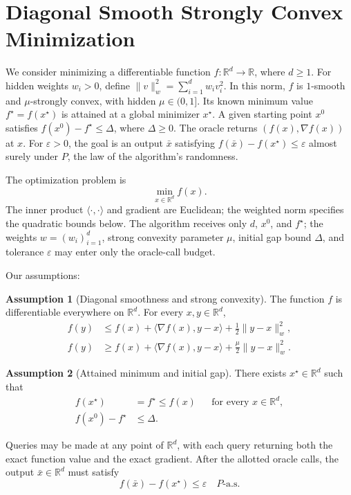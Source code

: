 \documentclass[10pt]{article}
\theoremstyle{definition}
\newtheorem{assumption}{Assumption}
\begin{document}
\section*{Diagonal Smooth Strongly Convex Minimization}
We consider minimizing a differentiable function $f:\mathbb{R}^d\to\mathbb{R}$, where $d\geq 1$. For hidden weights $w_i>0$, define $\|v\|_w^2=\sum_{i=1}^d w_i v_i^2$. In this norm, $f$ is $1$-smooth and $\mu$-strongly convex, with hidden $\mu\in(0,1]$. Its known minimum value $f^\star=f(x^\star)$ is attained at a global minimizer $x^\star$. A given starting point $x^0$ satisfies $f(x^0)-f^\star\leq\Delta$, where $\Delta\geq0$. The oracle returns $(f(x),\nabla f(x))$ at $x$. For $\varepsilon>0$, the goal is an output $\bar{x}$ satisfying $f(\bar{x})-f(x^\star)\leq\varepsilon$ almost surely under $P$, the law of the algorithm's randomness.

The optimization problem is
\[
\min_{x\in\mathbb{R}^d} f(x).
\]
The inner product $\langle\cdot,\cdot\rangle$ and gradient are Euclidean; the weighted norm specifies the quadratic bounds below. The algorithm receives only $d$, $x^0$, and $f^\star$; the weights $w=(w_i)_{i=1}^d$, strong convexity parameter $\mu$, initial gap bound $\Delta$, and tolerance $\varepsilon$ may enter only the oracle-call budget.

Our assumptions:
\begin{assumption}[Diagonal smoothness and strong convexity]
The function $f$ is differentiable everywhere on $\mathbb{R}^d$. For every $x,y\in\mathbb{R}^d$,
\[
\begin{aligned}
f(y)&\leq f(x)+\langle\nabla f(x),y-x\rangle
       +\frac{1}{2}\|y-x\|_w^2,\\
f(y)&\geq f(x)+\langle\nabla f(x),y-x\rangle
       +\frac{\mu}{2}\|y-x\|_w^2.
\end{aligned}
\]
\end{assumption}

\begin{assumption}[Attained minimum and initial gap]
There exists $x^\star\in\mathbb{R}^d$ such that
\[
\begin{aligned}
f(x^\star)&=f^\star\leq f(x)
&&\text{for every }x\in\mathbb{R}^d,\\
f(x^0)-f^\star&\leq\Delta.
\end{aligned}
\]
\end{assumption}

Queries may be made at any point of $\mathbb{R}^d$, with each query returning both the exact function value and the exact gradient. After the allotted oracle calls, the output $\bar{x}\in\mathbb{R}^d$ must satisfy
\[
f(\bar{x})-f(x^\star)\leq\varepsilon
\quad P\text{-a.s.}
\]
\end{document}
